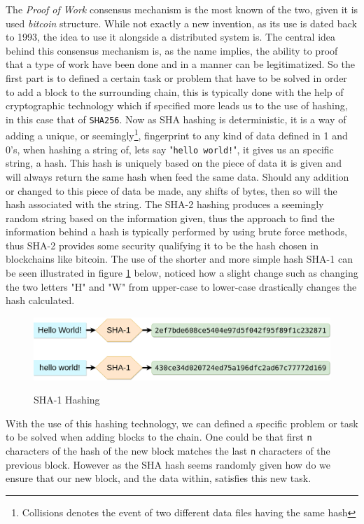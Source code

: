 \documentclass[paper=a4, fontsize=11pt]{scrartcl} %
\numberwithin{equation}{section} %
\numberwithin{figure}{section} %
\numberwithin{table}{section} %
\begin{document}
The \textit{Proof of Work} consensus mechanism is the most known of the two, given it is used \textit{bitcoin} structure. While not exactly a new invention, as its use is dated back to 1993, the idea to use it alongside a distributed system is\cite{proof}. The central idea behind this consensus mechanism is, as the name implies, the ability to proof that a type of work have been done and in a manner can be legitimatized. So the first part is to defined a certain task or problem that have to be solved in order to add a block to the surrounding chain, this is typically done with the help of cryptographic technology which if specified more leads us to the use of hashing, in this case that of \texttt{SHA256}. Now as SHA hashing is deterministic, it is a way of adding a unique, or seemingly\footnote{Collisions denotes the event of two different data files having the same hash\cite{collision}}, fingerprint to any kind of data defined in 1 and 0's, when hashing a string of, lets say "\texttt{hello world!}", it gives us an specific string, a hash. This hash is uniquely based on the piece of data it is given and will always return the same hash when feed the same data. Should any addition or changed to this piece of data be made, any shifts of bytes, then so will the hash associated with the string. The SHA-2 hashing produces a seemingly random string based on the information given, thus the approach to find the information behind a hash is typically performed by using brute force methods, thus SHA-2 provides some security qualifying it to be the hash chosen in blockchains like bitcoin\cite{sha}. The use of the shorter and more simple hash SHA-1 can be seen illustrated in figure \ref{fig:hash} below, noticed how a slight change such as changing the two letters "H" and "W" from upper-case to lower-case drastically changes the hash calculated.

\begin{figure}[H]
  \caption{SHA-1 Hashing}
  \centering
    \includegraphics[width=1\textwidth]{hash.png}
  \label{fig:hash}
\end{figure}

With the use of this hashing technology, we can defined a specific problem or task to be solved when adding blocks to the chain. One could be that first \texttt{n} characters of the hash of the new block matches the last \texttt{n} characters of the previous block. However as the SHA hash seems randomly given how do we ensure that our new block, and the data within, satisfies this new task.\\
\end{document}

